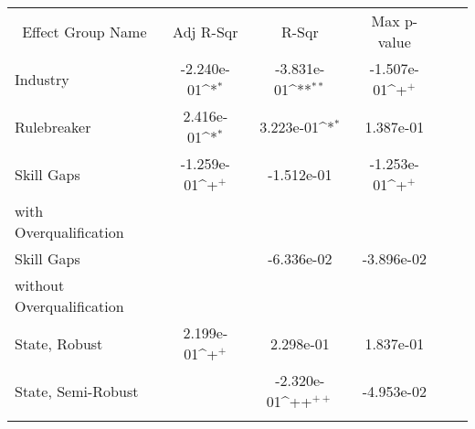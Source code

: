 {
\def\sym#1{\ifmmode^{#1}\else\(^{#1}\)\fi}
\begin{tabular}{l*{5}{c}}
    \toprule
    \multicolumn{1}{c}{Effect Group Name} & \multicolumn{1}{c}{Adj R-Sqr} & \multicolumn{1}{c}{R-Sqr} & \multicolumn{1}{c}{Max p-value} \\
    Industry                              & -2.240e-01\sym{*}             & -3.831e-01\sym{**}        & -1.507e-01\sym{+}               \\
    \addlinespace
    Rulebreaker                           & 2.416e-01\sym{*}              & 3.223e-01\sym{*}          & 1.387e-01                       \\
    \addlinespace
    Skill Gaps                            & -1.259e-01\sym{+}             & -1.512e-01                & -1.253e-01\sym{+}               \\
    with Overqualification                &                               &                           &                                 \\
    \addlinespace
    Skill Gaps                            &                               & -6.336e-02                & -3.896e-02                      \\
    without Overqualification             &                               &                           &                                 \\
    \addlinespace
    State, Robust                         & 2.199e-01\sym{+}              & 2.298e-01                 & 1.837e-01                       \\
    \addlinespace
    State, Semi-Robust                    &                               & -2.320e-01\sym{++}        & -4.953e-02                      \\
    \addlinespace
    \bottomrule
\end{tabular}
}
